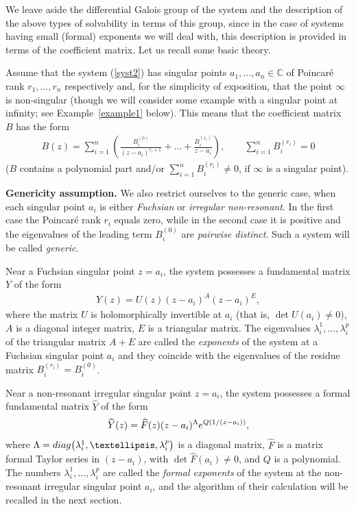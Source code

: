\documentclass[11pt]{article}
\numberwithin{equation}{section}
\begin{document}
We leave aside the differential Galois group of the system and the description of the above types of solvability in terms of
this group, since in the case of systems having small (formal) exponents we will deal with, this description is provided in
terms of the coefficient matrix. Let us recall some basic theory.

Assume that the system (\ref{syst2}) has singular points $a_1,\ldots,a_n\in\mathbb C$ of Poincar\'e rank $r_1,\ldots,r_n$
respectively and, for the simplicity of exposition, that the point $\infty$ is non-singular (though we will consider some example with a singular point at infinity; see Example~\ref{example1} below). This means that the coefficient matrix $B$ has the form
\begin{gather}\label{matrix2}
B(z)=\sum_{i=1}^n\left(\frac{B^{(0)}_i}{(z-a_i)^{r_i+1}}+\dots+\frac{B^{(r_i)}_i}{z-a_i}\right), \qquad
\sum_{i=1}^nB^{(r_i)}_i=0
\end{gather}
($B$ contains a polynomial part and/or $\sum\limits_{i=1}^nB^{(r_i)}_i\ne0$, if $\infty$ is a singular point).
\medskip

{\bf Genericity assumption.} We also restrict ourselves to the generic case, when each singular point $a_i$ is either
{\it Fuchsian} or {\it irregular non-resonant}. In the first case the Poincar\'e rank $r_i$ equals zero, while in the second
case it is positive and the eigenvalues of the leading term $B^{(0)}_i$ are {\it pairwise distinct}. Such a system will be
called {\it generic}.
\medskip

Near a Fuchsian singular point $z=a_i$, the system possesses a fundamental matrix $Y$ of the form
\begin{gather*}
Y(z)=U(z)(z-a_i)^A(z-a_i)^E,
\end{gather*}
where the matrix $U$ is holomorphically invertible at $a_i$ (that is, $\det U(a_i)\ne0$), $A$ is a diagonal integer matrix,
$E$ is a triangular matrix. The eigenvalues $\lambda_i^1,\ldots,\lambda_i^p$ of the triangular matrix $A+E$ are called the
{\it exponents} of the system at a Fuchsian singular point $a_i$ and they coincide with the eigenvalues of the residue matrix
$B^{(r_i)}_i=B^{(0)}_i$.

Near a non-resonant irregular singular point $z=a_i$, the system possesses a formal fundamental matrix $\widehat Y$ of the form
\begin{gather}\label{ffm}
\widehat Y(z)=\widehat F(z)(z-a_i)^{\Lambda} {\rm e}^{Q(1/(z-a_i))},
\end{gather}
where $\Lambda={\rm diag}\big(\lambda_i^1,\ldots,\lambda_i^p\big)$ is a diagonal matrix, $\widehat F$ is a matrix formal Taylor series
in $(z-a_i)$, with $\det\widehat F(a_i)\ne0$, and $Q$ is a polynomial. The numbers $\lambda_i^1,\ldots,\lambda_i^p$ are called
the {\it formal exponents} of the system at the non-resonant irregular singular point $a_i$, and the algorithm of their calculation will be recalled in the next section.
\end{document}
